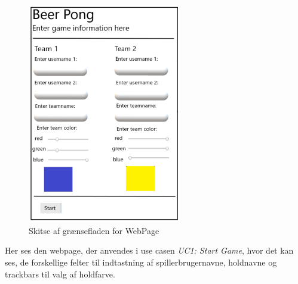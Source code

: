 \documentclass[Rapport/Rapport_main.tex]{subfiles}
\begin{document}
\begin{figure}[H]
    \centering
    \includegraphics[width=0.6\textwidth]{Kravspecifikation/Ikke-funktionelle/graphics/WebPage_IF.png}
    \caption{Skitse af grænsefladen for WebPage}
   \label{fig:rap_webpage_sketch}
\end{figure}

Her ses den webpage, der anvendes i use casen \textit{UC1: Start Game}, hvor det kan ses, de forskellige felter til indtastning af spillerbrugernavne, holdnavne og trackbars til valg af holdfarve.
\end{document}
